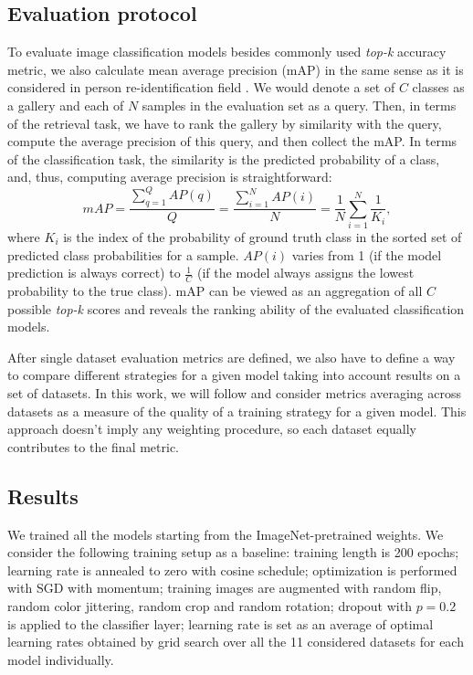 \documentclass[runningheads]{llncs}
\begin{document}
\subsection{Evaluation protocol}
To evaluate image classification models besides commonly used \textit{top-k} accuracy
metric, we also calculate mean average precision (mAP) in the same sense as it is
considered in person re-identification field \cite{Zheng2015ScalablePR}. We would denote a set of $C$ classes as
a gallery and each of $N$ samples in the evaluation set as a query. Then, in terms of
the retrieval task, we have to rank the gallery by similarity with the query, compute the average precision
of this query, and then collect the mAP. In terms of the classification task, the similarity is the
predicted probability of a class, and, thus, computing average precision is straightforward:
\begin{displaymath}
  mAP=\frac{\sum_{q=1}^Q AP(q)}{Q}=\frac{\sum_{i=1}^N AP(i)}{N}=\frac{1}{N}\sum_{i=1}^N \frac{1}{K_i},
\end{displaymath}
where $K_i$ is the index of the probability of ground truth class in the sorted set
of predicted class probabilities for a sample. $AP(i)$ varies from 1 (if the model prediction is always correct)
to $\frac{1}{C}$ (if the model always assigns the lowest probability to the true class). mAP can
be viewed as an aggregation of all $C$ possible \textit{top-k} scores and reveals the ranking
ability of the evaluated classification models.

After single dataset evaluation metrics are defined, we also have to define a way to compare
different strategies for a given model taking into account results on a set of datasets. In this work,
we will follow \cite{Zhai2019TheVT} and consider metrics averaging across datasets as a measure of the quality
of a training strategy for a given model. This approach doesn't imply any weighting procedure,
so each dataset equally contributes to the final metric.

\subsection{Results}

We trained all the models starting from the ImageNet-pretrained weights.
We consider the following training setup as a baseline: training length is 200 epochs;
learning rate is annealed to zero with cosine schedule; optimization is performed with SGD with momentum;
training images are augmented with random flip, random color jittering, random crop and random rotation;
dropout with $p=0.2$ is applied to the classifier layer; learning rate is set as
an average of optimal learning rates obtained by grid search over all the 11 considered datasets for each model
individually.
\end{document}
